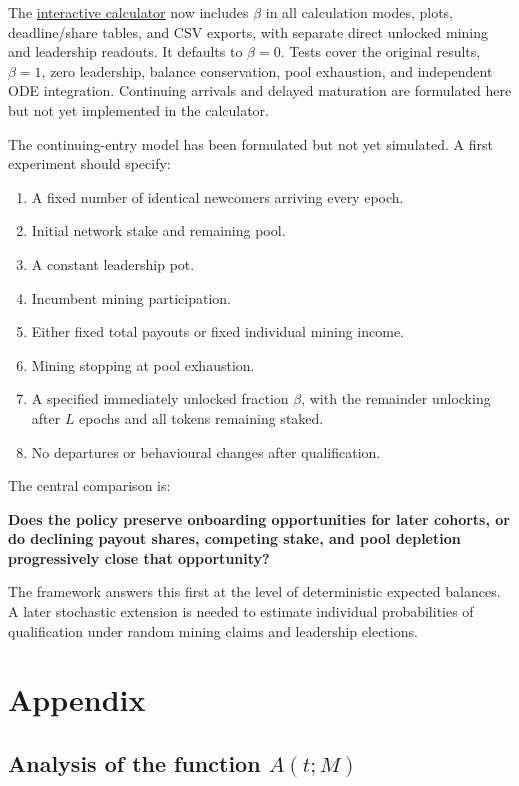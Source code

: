 \documentclass[11pt,a4paper]{article}
\begin{document}
The \href{https://amozeika.github.io/onboarding-calculator/}{interactive calculator} now includes $\beta$ in all calculation modes, plots, deadline/share tables, and CSV exports, with separate direct unlocked mining and leadership readouts. It defaults to $\beta=0$. Tests cover the original results, $\beta=1$, zero leadership, balance conservation, pool exhaustion, and independent ODE integration. Continuing arrivals and delayed maturation are formulated here but not yet implemented in the calculator.

The continuing-entry model has been formulated but not yet simulated. A first experiment should specify:
\begin{enumerate}
\item A fixed number of identical newcomers arriving every epoch.
\item Initial network stake and remaining pool.
\item A constant leadership pot.
\item Incumbent mining participation.
\item Either fixed total payouts or fixed individual mining income.
\item Mining stopping at pool exhaustion.
\item A specified immediately unlocked fraction $\beta$, with the remainder unlocking after $L$ epochs and all tokens remaining staked.
\item No departures or behavioural changes after qualification.
\end{enumerate}
The central comparison is:

\textbf{Does the policy preserve onboarding opportunities for later cohorts, or do declining payout shares, competing stake, and pool depletion progressively close that opportunity?}

The framework answers this first at the level of deterministic expected balances. A later stochastic extension is needed to estimate individual probabilities of qualification under random mining claims and leadership elections.

\section{Appendix}

\subsection{Analysis of the function \texorpdfstring{$A(t;M)$}{A(t;M)}}
\label{sec:A-analysis}
\end{document}
